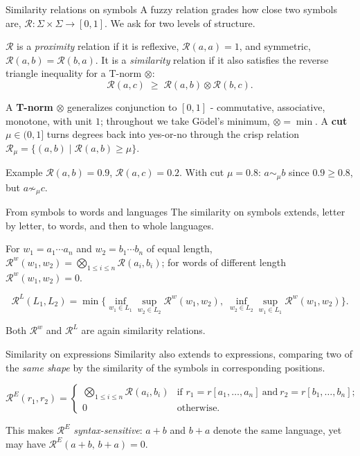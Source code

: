 \documentclass[aspectratio=169]{beamer}
\newcommand{\cR}{\mathcal{R}}
\newcommand{\cut}{\mu}
\begin{document}
\begin{frame}{Similarity relations on symbols}
  A fuzzy relation grades how close two symbols are,
  $\cR:\Sigma\times\Sigma\to[0,1]$. We ask for two levels of structure.
  \begin{definition}
    $\cR$ is a \emph{proximity} relation if it is reflexive, $\cR(a,a)=1$, and
    symmetric, $\cR(a,b)=\cR(b,a)$. It is a \emph{similarity} relation if it
    also satisfies the reverse triangle inequality for a T-norm $\otimes$:
    \[
      \cR(a,c)\;\ge\;\cR(a,b)\otimes\cR(b,c).
    \]
  \end{definition}
  A \textbf{T-norm} $\otimes$ generalizes conjunction to $[0,1]$ - commutative,
  associative, monotone, with unit $1$; throughout we take G\"odel's minimum,
  $\otimes=\min$. A \textbf{cut} $\cut\in(0,1]$ turns degrees back into
  yes-or-no through the crisp relation
  $\cR_\cut=\{(a,b)\mid \cR(a,b)\ge\cut\}$.
  \vfill
  \begin{block}{Example}
    $\cR(a,b)=0.9$, $\cR(a,c)=0.2$.
    With cut $\cut=0.8$: $a\sim_\cut b$ since $0.9\ge0.8$, but $a\not\sim_\cut c$.
  \end{block}
\end{frame}

\begin{frame}{From symbols to words and languages}
  The similarity on symbols extends, letter by letter, to words, and then to
  whole languages.
  \begin{definition}
    For $w_1=a_1\cdots a_n$ and $w_2=b_1\cdots b_n$ of equal length,
    $\cR^w(w_1,w_2)=\bigotimes_{1\le i\le n} \cR(a_i,b_i)$; for words of
    different length $\cR^w(w_1,w_2)=0$.
  \end{definition}
  \begin{definition}
    \[
      \cR^L(L_1,L_2)=\min\!\Big\{
        \inf_{w_1\in L_1}\sup_{w_2\in L_2}\cR^w(w_1,w_2),\;
        \inf_{w_2\in L_2}\sup_{w_1\in L_1}\cR^w(w_1,w_2)\Big\}.
    \]
  \end{definition}
  Both $\cR^w$ and $\cR^L$ are again similarity relations.
\end{frame}

\begin{frame}{Similarity on expressions}
  Similarity also extends to expressions, comparing two of the \emph{same shape}
  by the similarity of the symbols in corresponding positions.
  \begin{definition}
    \[
      \cR^E(r_1,r_2)=
      \begin{cases}
        \bigotimes_{1\le i\le n}\cR(a_i,b_i)
          & \text{if } r_1=r[a_1,\dots,a_n]\ \text{and}\ r_2=r[b_1,\dots,b_n];\\[0.4ex]
        0 & \text{otherwise.}
      \end{cases}
    \]
  \end{definition}
  \vfill
  This makes $\cR^E$ \emph{syntax-sensitive}: $a+b$ and $b+a$ denote the
  same language, yet may have $\cR^E(a{+}b,\,b{+}a)=0$.
\end{frame}
\end{document}
